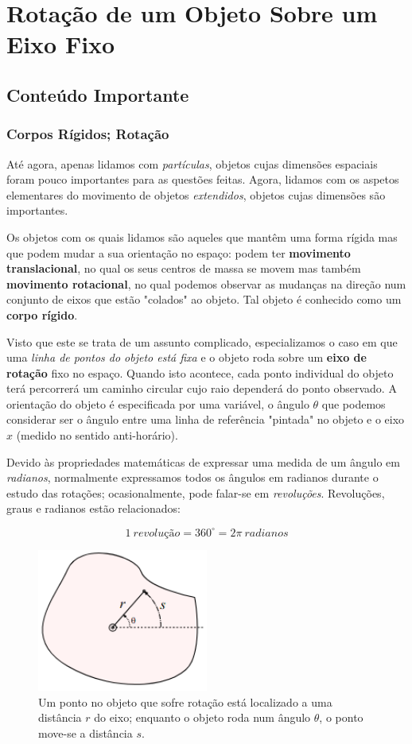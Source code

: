 \section{Rotação de um Objeto Sobre um Eixo Fixo}
\subsection{Conteúdo Importante}
\subsubsection{Corpos Rígidos; Rotação}

Até agora, apenas lidamos com \emph{partículas}, objetos cujas dimensões espaciais foram pouco importantes para as questões feitas. Agora, lidamos com os aspetos elementares do movimento de objetos \emph{extendidos}, objetos cujas dimensões são importantes.

Os objetos com os quais lidamos são aqueles que mantêm uma forma rígida mas que podem mudar a sua orientação no espaço: podem ter \textbf{movimento translacional}, no qual os seus centros de massa se movem mas também \textbf{movimento rotacional}, no qual podemos observar as mudanças na direção num conjunto de eixos que estão "colados" ao objeto. Tal objeto é conhecido como um \textbf{corpo rígido}.

Visto que este se trata de um assunto complicado, especializamos o caso em que uma \emph{linha de pontos do objeto está fixa} e o objeto roda sobre um \textbf{eixo de rotação} fixo no espaço. Quando isto acontece, cada ponto individual do objeto terá percorrerá um caminho circular cujo raio dependerá do ponto observado. A orientação do objeto é especificada por uma variável, o ângulo $\theta$ que podemos considerar ser o ângulo entre uma linha de referência "pintada" no objeto e o eixo $x$ (medido no sentido anti-horário).

Devido às propriedades matemáticas de expressar uma medida de um ângulo em \emph{radianos}, normalmente expressamos todos os ângulos em radianos durante o estudo das rotações; ocasionalmente, pode falar-se em \emph{revoluções}. Revoluções, graus e radianos estão relacionados:

$$
1\ revolução=360^{\circ}=2\pi\ radianos
$$

\begin{figure}[h!]
    \centering
    \includegraphics[width=0.5\textwidth]{7/fig/rot1.png}
    \caption{Um ponto no objeto que sofre rotação está localizado a uma distância $r$ do eixo; enquanto o objeto roda num ângulo $\theta$, o ponto move-se a distância $s$.}
\end{figure}

